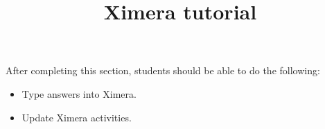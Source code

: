 \documentclass{ximera}
\title{Ximera tutorial}
\begin{document}
\begin{abstract}
\end{abstract}

\maketitle

\begin{sectionOutcomes}

After completing this section, students should be able to do the following:

\begin{itemize}
\item Type answers into Ximera.
\item Update Ximera activities.
\end{itemize}

\end{sectionOutcomes}
\end{document}
